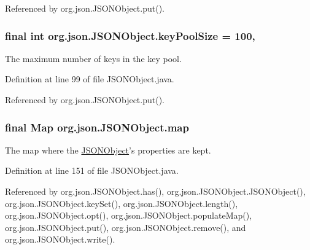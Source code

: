 Referenced by org.\-json.\-J\-S\-O\-N\-Object.\-put().

\hypertarget{classorg_1_1json_1_1_j_s_o_n_object_a982bf3253548748e80d16b1783a22ccc}{
\subsubsection[{key\-Pool\-Size}]{\setlength{\rightskip}{0pt plus 5cm}final int org.\-json.\-J\-S\-O\-N\-Object.\-key\-Pool\-Size = 100\hspace{0.3cm}{\ttfamily [static]}, {\ttfamily [private]}}}\label{classorg_1_1json_1_1_j_s_o_n_object_a982bf3253548748e80d16b1783a22ccc}
The maximum number of keys in the key pool. 

Definition at line 99 of file J\-S\-O\-N\-Object.\-java.



Referenced by org.\-json.\-J\-S\-O\-N\-Object.\-put().

\hypertarget{classorg_1_1json_1_1_j_s_o_n_object_a88de444c62dae3f3193d1276bb87ba31}{
\subsubsection[{map}]{\setlength{\rightskip}{0pt plus 5cm}final Map org.\-json.\-J\-S\-O\-N\-Object.\-map\hspace{0.3cm}{\ttfamily [private]}}}\label{classorg_1_1json_1_1_j_s_o_n_object_a88de444c62dae3f3193d1276bb87ba31}
The map where the \hyperlink{classorg_1_1json_1_1_j_s_o_n_object}{J\-S\-O\-N\-Object}'s properties are kept. 

Definition at line 151 of file J\-S\-O\-N\-Object.\-java.



Referenced by org.\-json.\-J\-S\-O\-N\-Object.\-has(), org.\-json.\-J\-S\-O\-N\-Object.\-J\-S\-O\-N\-Object(), org.\-json.\-J\-S\-O\-N\-Object.\-key\-Set(), org.\-json.\-J\-S\-O\-N\-Object.\-length(), org.\-json.\-J\-S\-O\-N\-Object.\-opt(), org.\-json.\-J\-S\-O\-N\-Object.\-populate\-Map(), org.\-json.\-J\-S\-O\-N\-Object.\-put(), org.\-json.\-J\-S\-O\-N\-Object.\-remove(), and org.\-json.\-J\-S\-O\-N\-Object.\-write().

